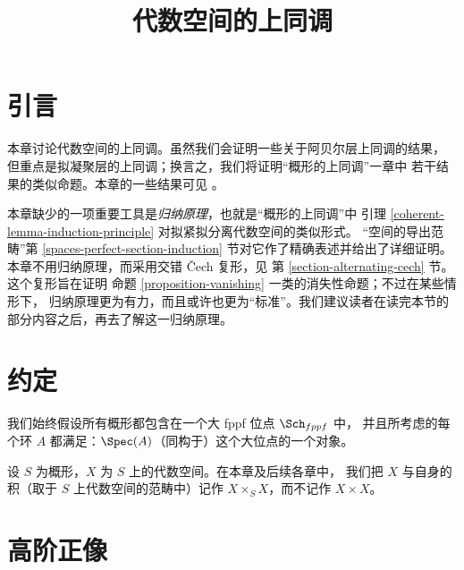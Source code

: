 

%


\title{代数空间的上同调}

\maketitle

\label{section-phantom}

\tableofcontents




\section{引言}
\label{section-introduction}

\noindent
本章讨论代数空间的上同调。虽然我们会证明一些关于阿贝尔层上同调的结果，
但重点是拟凝聚层的上同调；换言之，我们将证明“概形的上同调”一章中
若干结果的类似命题。本章的一些结果可见 \cite{Kn}。

\medskip\noindent
本章缺少的一项重要工具是{\it 归纳原理}，也就是“概形的上同调”中
引理 \ref{coherent-lemma-induction-principle} 对拟紧拟分离代数空间的类似形式。
“空间的导出范畴”第 \ref{spaces-perfect-section-induction} 节对它作了精确表述并给出了详细证明。
本章不用归纳原理，而采用交错 {\v C}ech 复形，见
第 \ref{section-alternating-cech} 节。这个复形旨在证明
命题 \ref{proposition-vanishing} 一类的消失性命题；不过在某些情形下，
归纳原理更为有力，而且或许也更为“标准”。我们建议读者在读完本节的
部分内容之后，再去了解这一归纳原理。



\section{约定}
\label{section-conventions}

\noindent
我们始终假设所有概形都包含在一个大 fppf 位点 $\Sch_{fppf}$ 中，
并且所考虑的每个环 $A$ 都满足：$\Spec(A)$（同构于）这个大位点的一个对象。

\medskip\noindent
设 $S$ 为概形，$X$ 为 $S$ 上的代数空间。在本章及后续各章中，
我们把 $X$ 与自身的积（取于 $S$ 上代数空间的范畴中）记作
$X \times_S X$，而不记作 $X \times X$。








\section{高阶正像}
\label{section-higher-direct-image}

